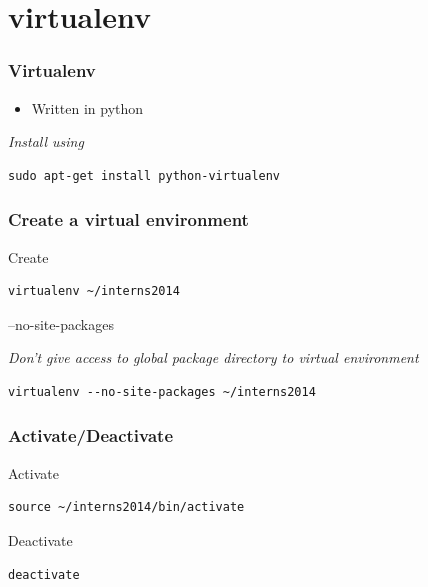 \documentclass[bigger, presentation]{beamer}
\begin{document}
\section{virtualenv}
\label{sec-2}
\begin{frame}[fragile]
\frametitle{Virtualenv}
\label{sec-2-1}


\begin{itemize}
\item Written in python
\end{itemize}

   \emph{Install using}


\begin{verbatim}
sudo apt-get install python-virtualenv
\end{verbatim}
\end{frame}
\begin{frame}[fragile]
\frametitle{Create a virtual environment}
\label{sec-2-2}
\begin{block}{Create}
\label{sec-2-2-1}


\begin{verbatim}
virtualenv ~/interns2014
\end{verbatim}

    
\end{block}
\begin{block}{--no-site-packages}
\label{sec-2-2-2}

    \emph{Don't give access to global package directory to virtual     environment}

\begin{verbatim}
virtualenv --no-site-packages ~/interns2014
\end{verbatim}
\end{block}
\end{frame}
\begin{frame}[fragile]
\frametitle{Activate/Deactivate}
\label{sec-2-3}
\begin{block}{Activate}
\label{sec-2-3-1}


\begin{verbatim}
source ~/interns2014/bin/activate
\end{verbatim}
\end{block}
\begin{block}{Deactivate}
\label{sec-2-3-2}


\begin{verbatim}
deactivate
\end{verbatim}
\end{block}
\end{frame}
\end{document}
